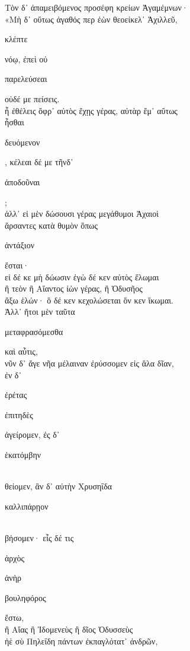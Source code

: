 \documentclass{ransom}
\begin{document}
\renewcommand{\rightheaderwhat}{\rightheaderwhatglosses}%
\begin{foreignpage}
\begin{graytext}
Τὸν δ᾽ ἀπαμειβόμενος προσέφη κρείων Ἀγαμέμνων·\hfill{}\\
«Μὴ δ᾽ οὕτως ἀγαθός περ ἐὼν θεοείκελ᾽ Ἀχιλλεῦ,\\
\begin{whitetext}κλέπτε\end{whitetext} νόῳ, ἐπεὶ οὐ \begin{whitetext}παρελεύσεαι\end{whitetext} οὐδέ με πείσεις.\\
ἦ ἐθέλεις ὄφρ᾽ αὐτὸς ἔχῃς γέρας, αὐτὰρ ἔμ᾽ αὔτως\\
ἧσθαι \begin{whitetext}δευόμενον\end{whitetext}, κέλεαι δέ με τῆνδ᾽ \begin{whitetext}ἀποδοῦναι\end{whitetext};\\
ἀλλ᾽ εἰ μὲν δώσουσι γέρας μεγάθυμοι Ἀχαιοὶ\hfill{}\\
ἄρσαντες κατὰ θυμὸν ὅπως \begin{whitetext}ἀντάξιον\end{whitetext} ἔσται·\\
εἰ δέ κε μὴ δώωσιν ἐγὼ δέ κεν αὐτὸς ἕλωμαι\\
ἢ τεὸν ἢ Αἴαντος ἰὼν γέρας, ἢ Ὀδυσῆος\\
ἄξω ἑλών· ὃ δέ κεν κεχολώσεται ὅν κεν ἵκωμαι.\\
Ἀλλ᾽ ἤτοι μὲν ταῦτα \begin{whitetext}μεταφρασόμεσθα\end{whitetext} καὶ αὖτις,\hfill{}\\
νῦν δ᾽ ἄγε νῆα μέλαιναν ἐρύσσομεν εἰς ἅλα δῖαν,\\
ἐν δ᾽ \begin{whitetext}ἐρέτας\end{whitetext} \begin{whitetext}ἐπιτηδὲς\end{whitetext} ἀγείρομεν, ἐς δ᾽ \begin{whitetext}ἑκατόμβην\end{whitetext}\\
θείομεν, ἂν δ᾽ αὐτὴν Χρυσηΐδα \begin{whitetext}καλλιπάρῃον\end{whitetext}\\
βήσομεν· εἷς δέ τις \begin{whitetext}ἀρχὸς\end{whitetext} ἀνὴρ \begin{whitetext}βουληφόρος\end{whitetext} ἔστω,\\
ἢ Αἴας ἢ Ἰδομενεὺς ἢ δῖος Ὀδυσσεὺς\hfill{}\\
ἠὲ σὺ Πηλεΐδη πάντων ἐκπαγλότατ᾽ ἀνδρῶν,\\


\end{graytext}
\end{foreignpage}
\end{document}
